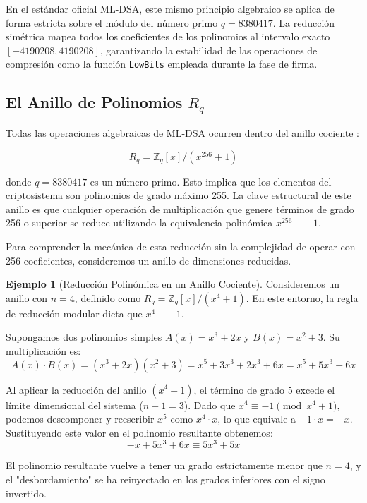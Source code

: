 \documentclass[11pt, a4paper]{report}
\theoremstyle{definition}
\newtheorem{ejemplo}{Ejemplo}[chapter]
\begin{document}
En el estándar oficial ML-DSA, este mismo principio algebraico se aplica de forma estricta sobre el módulo del número primo $q = 8380417$. La reducción simétrica mapea todos los coeficientes de los polinomios al intervalo exacto $[-4190208, 4190208]$, garantizando la estabilidad de las operaciones de compresión como la función \texttt{LowBits} empleada durante la fase de firma.

\subsection{El Anillo de Polinomios $R_q$}

Todas las operaciones algebraicas de ML-DSA ocurren dentro del anillo cociente \cite{peikert2016decade}:

$$ R_q = \mathbb{Z}_q[x]/(x^{256} + 1) $$

donde $q = 8380417$ es un número primo. Esto implica que los elementos del criptosistema son polinomios de grado máximo 255. La clave estructural de este anillo es que cualquier operación de multiplicación que genere términos de grado 256 o superior se reduce utilizando la equivalencia polinómica $x^{256} \equiv -1$.

Para comprender la mecánica de esta reducción sin la complejidad de operar con 256 coeficientes, consideremos un anillo de dimensiones reducidas.

\begin{ejemplo}[Reducción Polinómica en un Anillo Cociente]
\label{ex:reduccion_anillo}
Consideremos un anillo con $n=4$, definido como $R_q = \mathbb{Z}_q[x]/(x^4 + 1)$. En este entorno, la regla de reducción modular dicta que $x^4 \equiv -1$.

Supongamos dos polinomios simples $A(x) = x^3 + 2x$ y $B(x) = x^2 + 3$. Su multiplicación es:
\[ A(x) \cdot B(x) = (x^3 + 2x)(x^2 + 3) = x^5 + 3x^3 + 2x^3 + 6x = x^5 + 5x^3 + 6x \]

Al aplicar la reducción del anillo $(x^4 + 1)$, el término de grado 5 excede el límite dimensional del sistema ($n-1 = 3$). Dado que $x^4 \equiv -1 \pmod{x^4 + 1}$, podemos descomponer y reescribir $x^5$ como $x^4 \cdot x$, lo que equivale a $-1 \cdot x = -x$. Sustituyendo este valor en el polinomio resultante obtenemos:
\[-x + 5x^3 + 6x \equiv 5x^3 + 5x \]

El polinomio resultante vuelve a tener un grado estrictamente menor que $n=4$, y el "desbordamiento" se ha reinyectado en los grados inferiores con el signo invertido.
\end{ejemplo}
\end{document}

